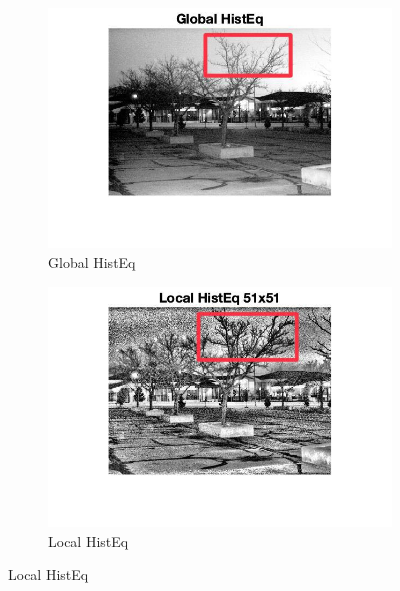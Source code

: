\documentclass[12pt]{article}
\begin{document}
    \begin{figure}[h!]
        \centering
        
        \begin{subfigure}[b]{0.4\textwidth}
            \centering
            \includegraphics[width=\textwidth]{../images/LC1_globalHistEq_1.jpeg}
            \caption{Global HistEq}
        \end{subfigure}
        \hfill
        \begin{subfigure}[b]{0.4\textwidth}
            \centering
            \includegraphics[width=\textwidth]{../images/LC1_localHistEq_1.jpeg}
            \caption{Local HistEq}
        \end{subfigure}
        
        \vspace{10pt} %
        

\end{figure}
\end{document}

